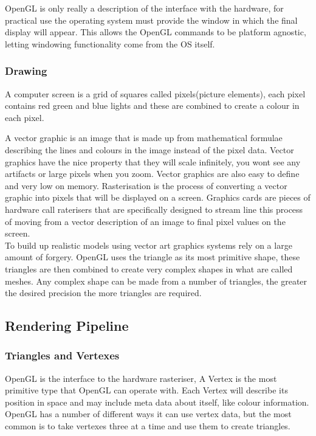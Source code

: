 OpenGL is only really a description of the interface with the hardware, for 
practical use the operating system must provide the window in which the final
display will appear. This allows the OpenGL commands to be platform agnostic, 
letting windowing functionality come from the OS itself.\\

\subsubsection*{Drawing}
A computer screen is a grid of squares called pixels(picture elements), each
pixel contains red green and blue lights and these are combined to create a 
colour in each pixel. 

A vector graphic is an image that is made up from mathematical formulae describing
the lines and colours in the image instead of the pixel data. Vector graphics
have the nice property that they will scale infinitely, you wont see any 
artifacts or large pixels when you zoom. Vector graphics are also easy to define
and very low on memory. Rasterisation is the process of converting a vector 
graphic into pixels that will be displayed on a screen. Graphics cards are 
pieces of hardware call raterisers that are specifically designed to stream line
this process of moving from a vector description of an image to final pixel 
values on the screen.\\

To build up realistic models using vector art graphics systems rely on a large
amount of forgery. OpenGL uses the triangle as its most primitive shape, these
triangles are then combined to create very complex shapes in what are called 
meshes. Any complex shape can be made from a number of triangles, the greater the
desired precision the more triangles are required.\\

\subsection{Rendering Pipeline}
\subsubsection{Triangles and Vertexes}
OpenGL is the interface to the hardware rasteriser, A Vertex is the most 
primitive type that OpenGL can operate with. Each Vertex will describe its 
position in space and may include meta data about itself, like colour 
information. OpenGL has a number of different ways it can use vertex data, but 
the most common is to take vertexes three at a time and use them to create 
triangles.\\

